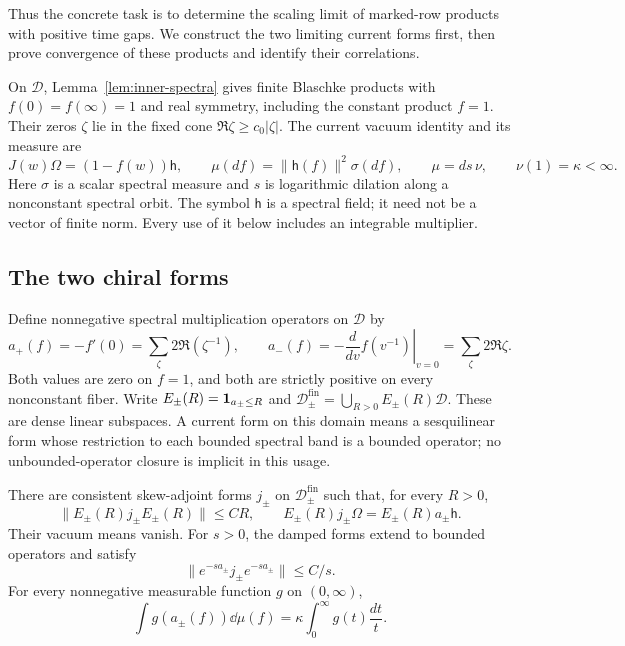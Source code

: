 Thus the concrete task is to determine the scaling limit of marked-row
products with positive time gaps. We construct the two limiting current
forms first, then prove convergence of these products and identify their
correlations.

On $\mathcal D$, Lemma~\ref{lem:inner-spectra} gives finite Blaschke products
with $f(0)=f(\infty)=1$ and real symmetry, including the constant product
$f=1$. Their zeros $\zeta$ lie in the fixed cone
$\Re\zeta\ge c_0|\zeta|$. The current vacuum identity and its measure are
\begin{equation}\label{eq:chiral-vacuum-data}
 J(w)\Omega=(1-f(w))\mathsf h,\qquad
 \mu(df)=\|\mathsf h(f)\|^2\sigma(df),\qquad
 \mu=ds\,\nu,\qquad \nu(1)=\kappa<\infty.
\end{equation}
Here $\sigma$ is a scalar spectral measure and $s$ is logarithmic
dilation along a nonconstant spectral orbit.
The symbol $\mathsf h$ is a spectral field; it need not be a vector of finite
norm. Every use of it below includes an integrable multiplier.

\subsection{The two chiral forms}

Define nonnegative spectral multiplication operators on $\mathcal D$ by
\begin{equation}\label{eq:chiral-energies}
 a_+(f)=-f'(0)=\sum_{\zeta}2\Re(\zeta^{-1}),\qquad
 a_-(f)=-\left.\frac{d}{dv}f(v^{-1})\right|_{v=0}
                         =\sum_{\zeta}2\Re\zeta.
\end{equation}
Both values are zero on $f=1$, and both are strictly positive on every
nonconstant fiber. Write $E_\pm(R)=\mathbf1_{a_\pm\le R}$ and
$\mathcal D_\pm^{\mathrm{fin}}=\bigcup_{R>0}E_\pm(R)\mathcal D$.
These are dense linear subspaces. A current form on this domain means a
sesquilinear form whose restriction to each bounded spectral band is a
bounded operator; no unbounded-operator closure is implicit in this usage.

\begin{lemma}\label{lem:chiral-forms}
There are consistent skew-adjoint forms $j_\pm$ on
$\mathcal D_\pm^{\mathrm{fin}}$ such that, for every $R>0$,
\begin{equation}\label{eq:chiral-form-bound}
 \|E_\pm(R)j_\pm E_\pm(R)\|\le CR,
 \qquad E_\pm(R)j_\pm\Omega=E_\pm(R)a_\pm\mathsf h.
\end{equation}
Their vacuum means vanish. For $s>0$, the damped forms extend to bounded
operators and satisfy
\begin{equation}\label{eq:chiral-damped-form}
                     \|e^{-sa_\pm}j_\pm e^{-sa_\pm}\|\le C/s.
\end{equation}
For every nonnegative measurable function $g$ on $(0,\infty)$,
\begin{equation}\label{eq:chiral-Haar-integral}
             \int g(a_\pm(f))\dd\mu(f)
                     =\kappa\int_0^\infty g(t)\frac{dt}{t}.
\end{equation}
\end{lemma}

